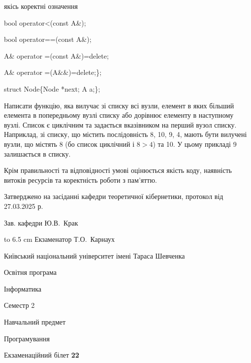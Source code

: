 \documentclass[12pt, ukrainian]{article}
\begin{document}
{\quad  якісь коректні означення 

\quad  bool operator<(const A\&); 

\quad  bool operator==(const A\&); 

\quad A\& operator =(const A\&)=delete; 

\quad  A\& operator =(A\&\&)=delete;\};

struct Node\{Node *next; A a;\};

 Написати функцію, яка вилучає зі списку всі вузли, елемент в яких більший елемента в попередньому вузлі списку або дорівнює елементу в наступному вузлі. Список є циклічним та задається вказівником на перший вузол списку. Наприклад, зі списку, що містить послідовність 8, 10, 9, 4, мають бути вилучені вузли, що містять 8 (бо список циклічний і $8>4$) та 10. У цьому прикладі 9 залишається в списку.

Крім правильності та відповідності умові оцінюється якість коду, наявність витоків ресурсів та коректність роботи з пам'яттю. 

}
{\smallskip\smallskip \begin {scriptsize} Затверджено на засіданні кафедри теоретичної кібернетики, протокол   від   27.03.2025 р.\par\smallskip\smallskip\smallskip\smallskip
{\parbox {6.5 cm} {Зав. кафедри \dotfill Ю.В.~Крак}}\hspace {0.7cm} {\hbox to 6.5 cm { Екзаменатор \dotfill Т.О.~Карнаух}} \end{scriptsize}}
\newpage
{{\begin {scriptsize}\par
{ \center  Київський національний університет імені Тараса Шевченка \par}
{\parbox {5 cm}{Освітня програма \hfill}{\parbox {7 cm}{Інформатика\hfill}}\parbox {6 cm}{\hfill Семестр 2}}\par
{\parbox {5 cm} {Навчальний предмет \hfill}\parbox {7 cm}{Програмування \hfill}\parbox {6cm}{\hfill}\par}\vspace{-15pt} \end{scriptsize}}{\center Екзаменаційний білет \No \textbf { 22 }\par}}
\end{document}
